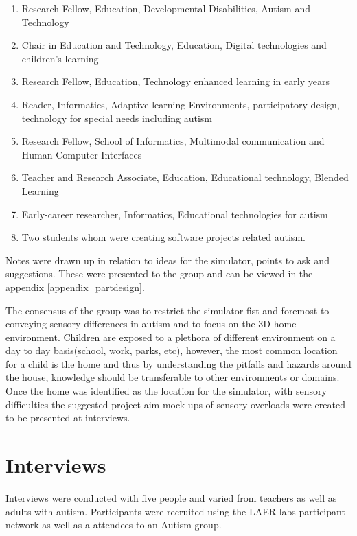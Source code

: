\documentclass[11pt]{report}
\begin{document}
\begin{enumerate}
\item Research Fellow, Education, Developmental Disabilities, Autism and Technology
\item Chair in Education and Technology, Education, Digital technologies and children’s learning
\item Research Fellow,  Education, Technology enhanced learning in early years
\item Reader, Informatics, Adaptive learning Environments, participatory
design, technology for special needs including autism
\item Research Fellow, School of Informatics, Multimodal communication and Human-Computer Interfaces
\item Teacher and Research Associate, Education, Educational technology, Blended Learning
\item Early-career researcher, Informatics, Educational technologies for autism
\item Two students whom were creating software projects related autism. 
\end{enumerate}


Notes were drawn up in relation to ideas for the simulator, points to ask and suggestions. These were presented to the group and can be viewed in the appendix \ref{appendix_partdesign}. 

The consensus of the group was to restrict the simulator fist and foremost to conveying sensory differences in autism and to focus on the 3D home environment. Children are exposed to a plethora of different environment on a day to day basis(school, work, parks, etc), however, the most common location for a child is the home and thus by understanding the pitfalls and hazards around the house, knowledge should be transferable to other environments or domains. Once the home was identified as the location for the simulator, with sensory difficulties the suggested project aim mock ups of sensory overloads were created to be presented at interviews.

\section{Interviews}
Interviews were conducted with five people and varied from teachers as well as adults with autism. Participants were recruited using the LAER labs participant network as well as a attendees to an Autism group.
\end{document}
